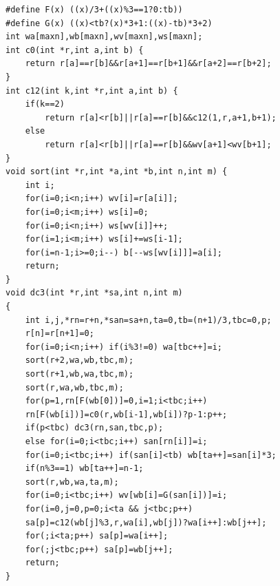 \documentclass[11pt]{article}
\begin{document}
\begingroup
\small
\begin{verbatim}
#define F(x) ((x)/3+((x)%3==1?0:tb))
#define G(x) ((x)<tb?(x)*3+1:((x)-tb)*3+2)
int wa[maxn],wb[maxn],wv[maxn],ws[maxn];
int c0(int *r,int a,int b) {
    return r[a]==r[b]&&r[a+1]==r[b+1]&&r[a+2]==r[b+2];
}
int c12(int k,int *r,int a,int b) {
    if(k==2)
        return r[a]<r[b]||r[a]==r[b]&&c12(1,r,a+1,b+1);
    else
        return r[a]<r[b]||r[a]==r[b]&&wv[a+1]<wv[b+1];
}
void sort(int *r,int *a,int *b,int n,int m) {
    int i;
    for(i=0;i<n;i++) wv[i]=r[a[i]];
    for(i=0;i<m;i++) ws[i]=0;
    for(i=0;i<n;i++) ws[wv[i]]++;
    for(i=1;i<m;i++) ws[i]+=ws[i-1];
    for(i=n-1;i>=0;i--) b[--ws[wv[i]]]=a[i];
    return;
}
void dc3(int *r,int *sa,int n,int m)
{
    int i,j,*rn=r+n,*san=sa+n,ta=0,tb=(n+1)/3,tbc=0,p;
    r[n]=r[n+1]=0;
    for(i=0;i<n;i++) if(i%3!=0) wa[tbc++]=i;
    sort(r+2,wa,wb,tbc,m);
    sort(r+1,wb,wa,tbc,m);
    sort(r,wa,wb,tbc,m);
    for(p=1,rn[F(wb[0])]=0,i=1;i<tbc;i++)
    rn[F(wb[i])]=c0(r,wb[i-1],wb[i])?p-1:p++;
    if(p<tbc) dc3(rn,san,tbc,p);
    else for(i=0;i<tbc;i++) san[rn[i]]=i;
    for(i=0;i<tbc;i++) if(san[i]<tb) wb[ta++]=san[i]*3;
    if(n%3==1) wb[ta++]=n-1;
    sort(r,wb,wa,ta,m);
    for(i=0;i<tbc;i++) wv[wb[i]=G(san[i])]=i;
    for(i=0,j=0,p=0;i<ta && j<tbc;p++)
    sa[p]=c12(wb[j]%3,r,wa[i],wb[j])?wa[i++]:wb[j++];
    for(;i<ta;p++) sa[p]=wa[i++];
    for(;j<tbc;p++) sa[p]=wb[j++];
    return;
}
\end{verbatim}
\endgroup
\end{document}
